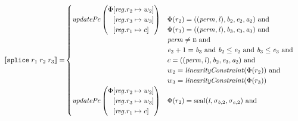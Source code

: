 \documentclass[a4paper]{article}
\newcommand{\sem}[1]{\left\llbracket #1 \right\rrbracket}
\newcommand{\tand}{\text{ and }}
\newcommand{\targetcolor}[1]{\color{black}}
\newcommand{\trg}[1]{{\targetcolor{} #1}}
\newcommand{\zinstr}[1]{\texttt{#1}}
\newcommand{\threeinstr}[4]{
  \ifthenelse{\equal{#2#3#4}{}}
  {\zinstr{#1}}
  {\zinstr{#1} \; #2 \; #3 \; #4}
}
\newcommand{\tsplice}[3]{\threeinstr{\trg{splice}}{#1}{#2}{#3}}
\newcommand{\update}[2]{[#1 \mapsto #2]}
\newcommand{\updReg}[2]{\update{\reg.#1}{#2}}
\newcommand{\shareddom}[1]{\mathrm{#1}}
\newcommand{\perm}{\var{perm}}
\newcommand{\lin}{\var{l}}
\newcommand{\seal}[1]{\shareddom{seal}(#1)}
\newcommand{\var}[1]{\mathit{#1}}
\newcommand{\reg}{\var{reg}}
\newcommand{\baddr}{\var{b}}
\newcommand{\eaddr}{\var{e}}
\newcommand{\aaddr}{\var{a}}
\newcommand{\plainperm}[1]{\textsc{#1}}
\newcommand{\enter}{\plainperm{e}}
\newcommand{\plainfun}[2]{
  \ifthenelse{\equal{#2}{}}
  {\mathit{#1}}
  {\mathit{#1}(#2)}
}
\newcommand{\updPcAddr}[1]{\plainfun{updatePc}{#1}}
\newcommand{\linCons}[1]{\plainfun{linearityConstraint}{#1}}
\begin{document}
\begin{align*}
  \sem{\tsplice{r_1}{r_2}{r_3}} = &
                              \begin{cases}
                                \updPcAddr{}\left(
                                \arraycolsep=0pt
                                \begin{array}{r l}
                                  \Phi&\updReg{r_2}{w_2}\\
                                      &\updReg{r_3}{w_3}\\
                                      &\updReg{r_1}{c}
                                \end{array}\right)
&
                                \arraycolsep=0pt
                                \begin{array}[t]{l}
                                  \Phi(r_2) = ((\perm,\lin),\baddr_2,\eaddr_2,\aaddr_2) \tand \\
                                  \Phi(r_3) = ((\perm,\lin),\baddr_3,\eaddr_3,\aaddr_3) \tand \\
                                  \perm \neq \enter \tand \\
                                  \eaddr_2 + 1 = \baddr_3 \tand \baddr_2 \leq \eaddr_2 \tand \baddr_3 \leq \eaddr_3 \tand \\
                                  c = ((\perm,\lin),\baddr_2,\eaddr_3,\aaddr_2) \tand\\
                                  w_2 = \linCons{\Phi(r_2)} \tand \\
                                  w_3 = \linCons{\Phi(r_3)} \\
                                \end{array}\\
                                \updPcAddr{}\left(
                                \arraycolsep=0pt
                                \begin{array}{r l}
                                  \Phi&\updReg{r_2}{w_2}\\
                                      &\updReg{r_3}{w_3}\\
                                      &\updReg{r_1}{c}
                                \end{array}\right)
&
                                \arraycolsep=0pt
                                \begin{array}[t]{l}
                                  \Phi(r_2) = \seal{\lin,\sigma_{\baddr,2},\sigma_{\eaddr,2}} \tand \\

\end{array}
\end{cases}
\end{align*}
\end{document}
